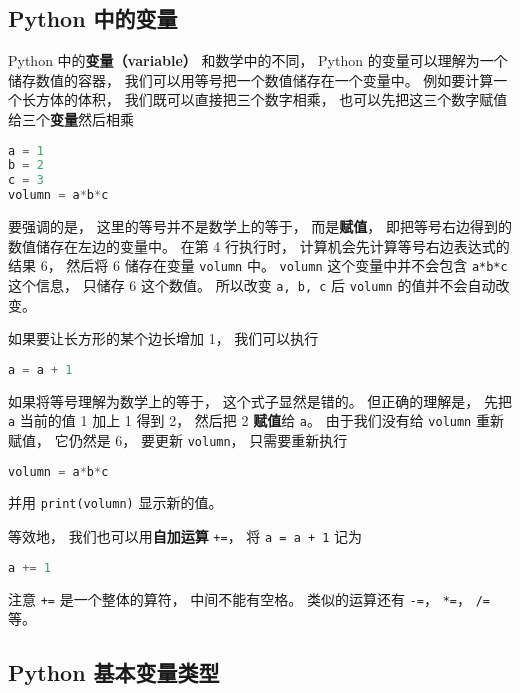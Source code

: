 
\begin{issues}
\issueDraft
\end{issues}

\subsection{Python 中的变量}
Python 中的\textbf{变量（variable）} 和数学中的不同， Python 的变量可以理解为一个储存数值的容器， 我们可以用等号把一个数值储存在一个变量中。 例如要计算一个长方体的体积， 我们既可以直接把三个数字相乘， 也可以先把这三个数字赋值给三个\textbf{变量}然后相乘
\begin{lstlisting}[language=python]
a = 1
b = 2
c = 3
volumn = a*b*c
\end{lstlisting}

要强调的是， 这里的等号并不是数学上的等于， 而是\textbf{赋值}， 即把等号右边得到的数值储存在左边的变量中。 在第 4 行执行时， 计算机会先计算等号右边表达式的结果 6， 然后将 6 储存在变量 \verb`volumn` 中。 \verb`volumn` 这个变量中并不会包含 \verb`a*b*c` 这个信息， 只储存 6 这个数值。 所以改变 \verb`a, b, c` 后 \verb`volumn` 的值并不会自动改变。

如果要让长方形的某个边长增加 1， 我们可以执行
\begin{lstlisting}[language=python]
a = a + 1
\end{lstlisting}
如果将等号理解为数学上的等于， 这个式子显然是错的。 但正确的理解是， 先把 \verb`a` 当前的值 1 加上 1 得到 2， 然后把 2 \textbf{赋值}给 \verb`a`。 由于我们没有给 \verb`volumn` 重新赋值， 它仍然是 6， 要更新 \verb`volumn`， 只需要重新执行
\begin{lstlisting}[language=python]
volumn = a*b*c
\end{lstlisting}
并用 \verb`print(volumn)` 显示新的值。

等效地， 我们也可以用\textbf{自加运算} \verb`+=`， 将 \verb`a = a + 1` 记为
\begin{lstlisting}[language=python]
a += 1
\end{lstlisting}
注意 \verb`+=` 是一个整体的算符， 中间不能有空格。 类似的运算还有 \verb`-=`， \verb`*=`， \verb`/=` 等。

\subsection{Python 基本变量类型}

